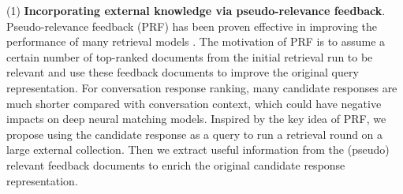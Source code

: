 
(1) \textbf{Incorporating external knowledge via pseudo-relevance feedback}. Pseudo-relevance feedback (PRF) has been proven effective in improving the performance of many retrieval models \cite{Lavrenko:2001:RBL:383952.383972,Lv:2009:CSM:1645953.1646259,Zamani:2016:PFB:2983323.2983844,Zhai:2001:MFL:502585.502654,rocchio71relevance,Cao:2008:SGE:1390334.1390377}. 
The motivation of PRF is to assume a certain number of top-ranked documents from the initial retrieval run to be relevant and use these feedback documents to improve the original query representation. For conversation response ranking, many candidate responses are much shorter compared with conversation context,  which could have negative impacts on deep neural matching models. Inspired by the key idea of PRF, we propose using the candidate response as a query to run a retrieval round on a large external collection. Then we extract useful information from the (pseudo) relevant feedback documents to enrich the original candidate response representation. 


